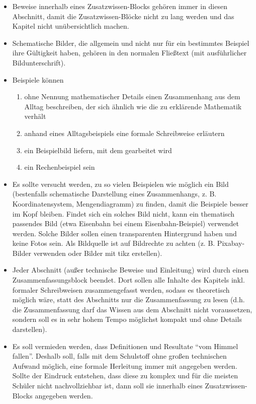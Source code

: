 \documentclass{article}
\begin{document}
\begin{itemize}[leftmargin=.5cm]
	\item Beweise innerhalb eines Zusatzwissen-Blocks gehören immer in diesen Abschnitt, damit die Zusatzwissen-Blöcke nicht zu lang werden und das Kapitel nicht unübersichtlich machen.
	\item Schematische Bilder, die allgemein und nicht nur für ein bestimmtes Beispiel ihre Gültigkeit haben, gehören in den normalen Fließtext (mit ausführlicher Bildunterschrift).
	\item Beispiele können 
		\begin{enumerate}
			\item ohne Nennung mathematischer Details einen Zusammenhang aus dem Alltag beschreiben, der sich ähnlich wie die zu erklärende Mathematik verhält
			\item anhand eines Alltagsbeispiels eine formale Schreibweise erläutern
			\item ein Beispielbild liefern, mit dem gearbeitet wird
			\item ein Rechenbeispiel sein
		\end{enumerate}
	\item Es sollte versucht werden, zu so vielen Beispielen wie möglich ein Bild (bestenfalls schematische Darstellung eines Zusammenhangs, z. B. Koordinatensystem, Mengendiagramm) zu finden, damit die Beispiele besser im Kopf bleiben. Findet sich ein solches Bild nicht, kann ein thematisch passendes Bild (etwa Eisenbahn bei einem Eisenbahn-Beispiel) verwendet werden. Solche Bilder sollen einen transparenten Hintergrund haben und keine Fotos sein. Als Bildquelle ist auf Bildrechte zu achten (z. B. Pixabay-Bilder verwenden oder Bilder mit tikz erstellen).
	\item Jeder Abschnitt (außer technische Beweise und Einleitung) wird durch einen Zusammenfassungsblock beendet. Dort sollen alle Inhalte des Kapitels inkl. formaler Schreibweisen zusammengefasst werden, sodass es theoretisch möglich wäre, statt des Abschnitts nur die Zusammenfassung zu lesen (d.h. die Zusammenfassung darf das Wissen aus dem Abschnitt nicht voraussetzen, sondern soll es in sehr hohem Tempo möglichst kompakt und ohne Details darstellen).
	\item Es soll vermieden werden, dass Definitionen und Resultate \enquote{vom Himmel fallen}. Deshalb soll, falls mit dem Schulstoff ohne großen technischen Aufwand möglich, eine formale Herleitung immer mit angegeben werden. Sollte der Eindruck entstehen, dass diese zu komplex und für die meisten Schüler nicht nachvollziehbar ist, dann soll sie innerhalb eines Zusatzwissen-Blocks angegeben werden.

\end{itemize}
\end{document}
